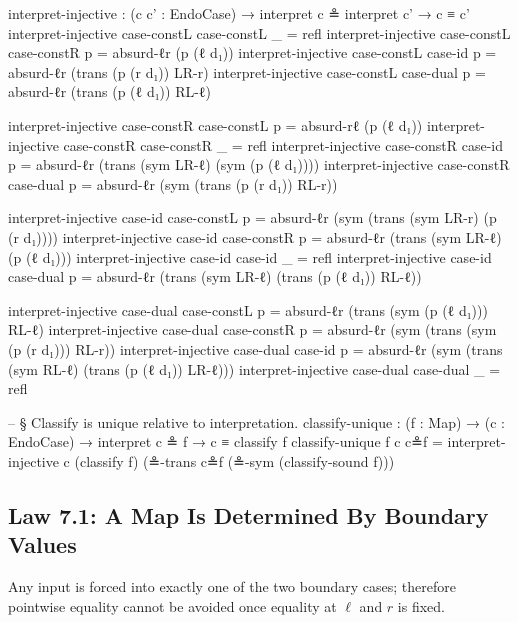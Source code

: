 \documentclass[11pt,a4paper]{book}
\begin{document}
\begin{code}
  interpret-injective :
    (c c' : EndoCase) →
    interpret c ≗ interpret c' →
    c ≡ c'
  interpret-injective case-constL case-constL _ = refl
  interpret-injective case-constL case-constR p = absurd-ℓr (p (ℓ d₁))
  interpret-injective case-constL case-id     p =
    absurd-ℓr (trans (p (r d₁)) LR-r)
  interpret-injective case-constL case-dual   p =
    absurd-ℓr (trans (p (ℓ d₁)) RL-ℓ)

  interpret-injective case-constR case-constL p =
    absurd-rℓ (p (ℓ d₁))
  interpret-injective case-constR case-constR _ = refl
  interpret-injective case-constR case-id     p =
    absurd-ℓr (trans (sym LR-ℓ) (sym (p (ℓ d₁))))
  interpret-injective case-constR case-dual   p =
    absurd-ℓr (sym (trans (p (r d₁)) RL-r))

  interpret-injective case-id     case-constL p =
    absurd-ℓr (sym (trans (sym LR-r) (p (r d₁))))
  interpret-injective case-id     case-constR p =
    absurd-ℓr (trans (sym LR-ℓ) (p (ℓ d₁)))
  interpret-injective case-id     case-id     _ = refl
  interpret-injective case-id     case-dual   p =
    absurd-ℓr (trans (sym LR-ℓ) (trans (p (ℓ d₁)) RL-ℓ))

  interpret-injective case-dual   case-constL p =
    absurd-ℓr (trans (sym (p (ℓ d₁))) RL-ℓ)
  interpret-injective case-dual   case-constR p =
    absurd-ℓr (sym (trans (sym (p (r d₁))) RL-r))
  interpret-injective case-dual   case-id     p =
    absurd-ℓr (sym (trans (sym RL-ℓ) (trans (p (ℓ d₁)) LR-ℓ)))
  interpret-injective case-dual   case-dual   _ = refl

  -- § Classify is unique relative to interpretation.
  classify-unique : (f : Map) → (c : EndoCase) → interpret c ≗ f → c ≡ classify f
  classify-unique f c c≗f =
    interpret-injective c (classify f) (≗-trans c≗f (≗-sym (classify-sound f)))
\end{code}

\subsection{Law 7.1: A Map Is Determined By Boundary Values}

Any input is forced into exactly one of the two boundary cases; therefore pointwise equality cannot be avoided once equality at $\ell$ and $r$ is fixed.
\end{document}
